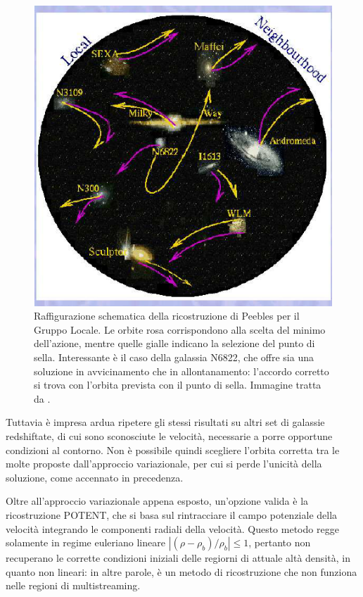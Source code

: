 \begin{center}
	\begin{figure}[H]
		\centering
		\includegraphics[scale=0.5, angle=0]{peebles.png}
        \caption{Raffigurazione schematica della ricostruzione di Peebles per il Gruppo Locale. Le orbite rosa
        corrispondono alla scelta del minimo dell'azione, mentre quelle gialle indicano la selezione del punto di sella.
        Interessante è il caso della galassia N6822, che offre sia una soluzione in avvicinamento che in allontanamento:
        l'accordo corretto si trova con l'orbita prevista con il punto di sella. Immagine tratta da \cite{mohayaee}.}
		\label{fig:peebles}
	\end{figure}
\end{center}

Tuttavia è impresa ardua ripetere gli stessi risultati su altri set di galassie redshiftate, di cui
sono sconosciute le velocità, necessarie a porre opportune condizioni al contorno. Non è possibile 
quindi scegliere l'orbita corretta tra le molte proposte dall'approccio variazionale, per cui si 
perde l'unicità della soluzione, come accennato in precedenza. 

Oltre all'approccio variazionale appena esposto, un'opzione valida è la ricostruzione POTENT, che si basa
sul rintracciare il campo potenziale della velocità integrando le componenti radiali della velocità.
Questo metodo regge solamente in regime euleriano lineare $|(\rho-\rho_b)/\rho_b|\leq 1$, pertanto non 
recuperano le corrette condizioni iniziali delle regiorni di attuale altà densità, in quanto non lineari:
in altre parole, è un metodo di ricostruzione che non funziona nelle regioni di multistreaming.

